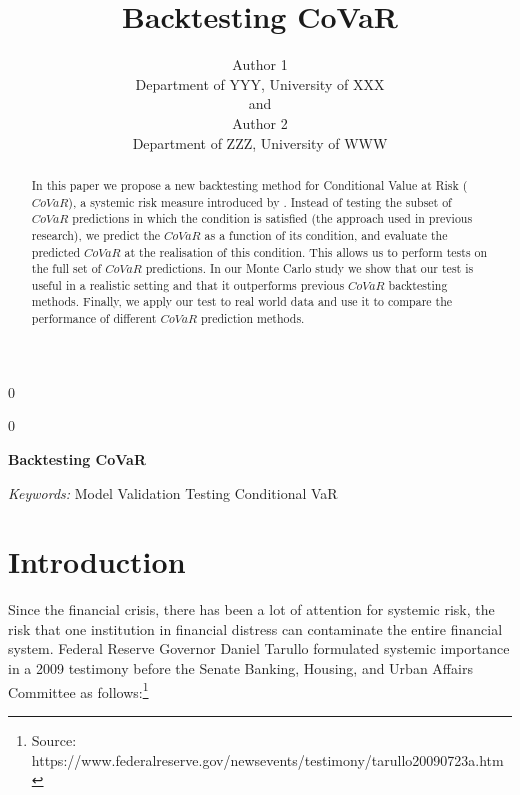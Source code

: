 \documentclass[12pt]{article}
\newcommand{\blind}{0}
\begin{document}
%

\def\spacingset#1{\renewcommand{\baselinestretch}%
{#1}\small\normalsize} \spacingset{1}



\blind
{
  \title{\bf Backtesting CoVaR}
  \author{Author 1\\
    Department of YYY, University of XXX\\
    and \\
    Author 2 \\
    Department of ZZZ, University of WWW}
  \maketitle
} \fi

\blind
{
  \bigskip
  \bigskip
  \bigskip
  \begin{center}
    {\LARGE\bf Backtesting CoVaR}
\end{center}
  \medskip
} \fi

\bigskip
\begin{abstract}
\noindent In this paper we propose a new backtesting method for Conditional Value at Risk ($CoVaR$), a systemic risk measure introduced by \citet{adrian}. Instead of testing the subset of $CoVaR$ predictions in which the condition is satisfied (the approach used in previous research), we predict the $CoVaR$ as a function of its condition, and evaluate the predicted $CoVaR$ at the realisation of this condition. This allows us to perform tests on the full set of $CoVaR$ predictions. In our Monte Carlo study we show that our test is useful in a realistic setting and that it outperforms previous $CoVaR$ backtesting methods. Finally, we apply our test to real world data and use it to compare the performance of different $CoVaR$ prediction methods.\end{abstract}

\noindent%
{\it Keywords:}  Model Validation Testing Conditional VaR
\vfill

\newpage
\spacingset{1.45} %





\section{Introduction}


Since the financial crisis, there has been a lot of attention for systemic risk, the risk that one institution in financial distress can contaminate the entire financial system. Federal Reserve Governor Daniel Tarullo formulated systemic importance in a 2009 testimony before the Senate Banking, Housing, and Urban Affairs Committee as follows:\footnote{Source: https://www.federalreserve.gov/newsevents/testimony/tarullo20090723a.htm}
\end{document}
